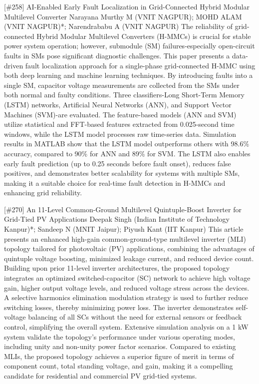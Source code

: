 {} \begin{abstract_online} {[\#258] AI-Enabled Early Fault Localization in Grid-Connected Hybrid Modular Multilevel Converter} {} {Narayana Murthy M (VNIT NAGPUR); MOHD ALAM (VNIT NAGPUR)*;  Narendrababu  A (VNIT NAGPUR)} {} The reliability of grid-connected Hybrid Modular Multilevel Converters (H-MMCs) is crucial for stable power system operation; however, submodule (SM) failures-especially open-circuit faults in SMs pose significant diagnostic challenges. This paper presents a data-driven fault localization approach for a single-phase grid-connected H-MMC using both deep learning and machine learning techniques. By introducing faults into a single SM, capacitor voltage measurements are collected from the SMs under both normal and faulty conditions. Three classifiers-Long Short-Term Memory (LSTM) networks, Artificial Neural Networks (ANN), and Support Vector Machines (SVM)-are evaluated. The feature-based models (ANN and SVM) utilize statistical and FFT-based features extracted from 0.025-second time windows, while the LSTM model processes raw time-series data. Simulation results in MATLAB show that the LSTM model outperforms others with 98.6\% accuracy, compared to 90\% for ANN and 89\% for SVM. The LSTM also enables early fault prediction (up to 0.25 seconds before fault onset), reduces false positives, and demonstrates better scalability for systems with multiple SMs, making it a suitable choice for real-time fault detection in H-MMCs and enhancing grid reliability. \end{abstract_online} 
{} \begin{abstract_online} {[\#270] An 11-Level Common-Ground Multilevel Quintuple-Boost Inverter for Grid-Tied PV Applications} {} {Deepak Singh (Indian Institute of Technology Kanpur)*; Sandeep N (MNIT Jaipur); Piyush Kant (IIT Kanpur)} {} This article presents an enhanced high-gain common-ground-type multilevel inverter (MLI) topology tailored for photovoltaic (PV) applications, combining the advantages of quintuple voltage boosting, minimized leakage current, and reduced device count. Building upon prior 11-level inverter architectures, the proposed topology integrates an optimized switched-capacitor (SC) network to achieve high voltage gain, higher output voltage levels, and reduced voltage stress across the devices. A selective harmonics elimination modulation strategy is used to further reduce switching losses, thereby minimizing power loss. The inverter demonstrates self-voltage balancing of all SCs without the need for external sensors or feedback control, simplifying the overall system. Extensive simulation analysis on a 1 kW system validate the topology's performance under various operating modes, including unity and non-unity power factor scenarios. Compared to existing MLIs, the proposed topology achieves a superior figure of merit in terms of component count, total standing voltage, and gain, making it a compelling candidate for residential and commercial PV grid-tied systems. \end{abstract_online} 
